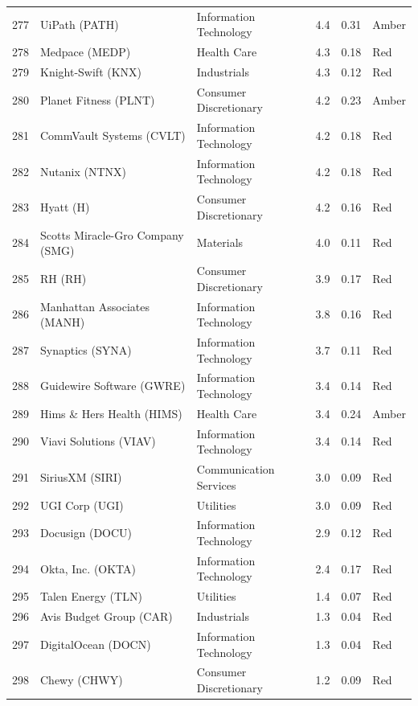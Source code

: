 \documentclass[11pt,a4paper]{article}
\begin{document}
{\begin{longtable}{r p{4.6cm} p{3cm} r r l}
277 & UiPath (PATH) & Information Technology & 4.4 & 0.31 & \cellcolor[HTML]{FFEB9C}Amber \\
278 & Medpace (MEDP) & Health Care & 4.3 & 0.18 & \cellcolor[HTML]{F4B6B6}Red \\
279 & Knight-Swift (KNX) & Industrials & 4.3 & 0.12 & \cellcolor[HTML]{F4B6B6}Red \\
280 & Planet Fitness (PLNT) & Consumer Discretionary & 4.2 & 0.23 & \cellcolor[HTML]{FFEB9C}Amber \\
281 & CommVault Systems (CVLT) & Information Technology & 4.2 & 0.18 & \cellcolor[HTML]{F4B6B6}Red \\
282 & Nutanix (NTNX) & Information Technology & 4.2 & 0.18 & \cellcolor[HTML]{F4B6B6}Red \\
283 & Hyatt (H) & Consumer Discretionary & 4.2 & 0.16 & \cellcolor[HTML]{F4B6B6}Red \\
284 & Scotts Miracle-Gro Company (SMG) & Materials & 4.0 & 0.11 & \cellcolor[HTML]{F4B6B6}Red \\
285 & RH (RH) & Consumer Discretionary & 3.9 & 0.17 & \cellcolor[HTML]{F4B6B6}Red \\
286 & Manhattan Associates (MANH) & Information Technology & 3.8 & 0.16 & \cellcolor[HTML]{F4B6B6}Red \\
287 & Synaptics (SYNA) & Information Technology & 3.7 & 0.11 & \cellcolor[HTML]{F4B6B6}Red \\
288 & Guidewire Software (GWRE) & Information Technology & 3.4 & 0.14 & \cellcolor[HTML]{F4B6B6}Red \\
289 & Hims \& Hers Health (HIMS) & Health Care & 3.4 & 0.24 & \cellcolor[HTML]{FFEB9C}Amber \\
290 & Viavi Solutions (VIAV) & Information Technology & 3.4 & 0.14 & \cellcolor[HTML]{F4B6B6}Red \\
291 & SiriusXM (SIRI) & Communication Services & 3.0 & 0.09 & \cellcolor[HTML]{F4B6B6}Red \\
292 & UGI Corp (UGI) & Utilities & 3.0 & 0.09 & \cellcolor[HTML]{F4B6B6}Red \\
293 & Docusign (DOCU) & Information Technology & 2.9 & 0.12 & \cellcolor[HTML]{F4B6B6}Red \\
294 & Okta, Inc. (OKTA) & Information Technology & 2.4 & 0.17 & \cellcolor[HTML]{F4B6B6}Red \\
295 & Talen Energy (TLN) & Utilities & 1.4 & 0.07 & \cellcolor[HTML]{F4B6B6}Red \\
296 & Avis Budget Group (CAR) & Industrials & 1.3 & 0.04 & \cellcolor[HTML]{F4B6B6}Red \\
297 & DigitalOcean (DOCN) & Information Technology & 1.3 & 0.04 & \cellcolor[HTML]{F4B6B6}Red \\
298 & Chewy (CHWY) & Consumer Discretionary & 1.2 & 0.09 & \cellcolor[HTML]{F4B6B6}Red \\
\hline
\end{longtable}}
\end{document}
